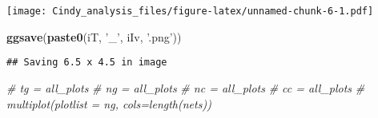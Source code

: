 \documentclass[]{article}
\newenvironment{Shaded}{\begin{snugshade}}{\end{snugshade}}
\newcommand{\KeywordTok}[1]{\textcolor[rgb]{0.13,0.29,0.53}{\textbf{#1}}}
\newcommand{\StringTok}[1]{\textcolor[rgb]{0.31,0.60,0.02}{#1}}
\newcommand{\CommentTok}[1]{\textcolor[rgb]{0.56,0.35,0.01}{\textit{#1}}}
\newcommand{\NormalTok}[1]{#1}
\begin{document}
\texttt{[image: Cindy\_analysis\_files/figure-latex/unnamed-chunk-6-1.pdf]}

\begin{Shaded}
\begin{Highlighting}[]
\KeywordTok{ggsave}\NormalTok{(}\KeywordTok{paste0}\NormalTok{(iT, }\StringTok{'_'}\NormalTok{, iIv, }\StringTok{'.png'}\NormalTok{))}
\end{Highlighting}
\end{Shaded}

\begin{verbatim}
## Saving 6.5 x 4.5 in image
\end{verbatim}

\begin{Shaded}
\begin{Highlighting}[]
\CommentTok{# tg = all_plots}
\CommentTok{# ng = all_plots}
\CommentTok{# nc = all_plots}
\CommentTok{# cc = all_plots}
\CommentTok{# multiplot(plotlist = ng, cols=length(nets))}
\end{Highlighting}
\end{Shaded}
\end{document}
